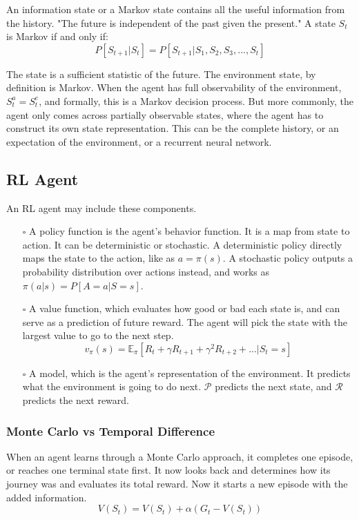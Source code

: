 \documentclass{article}
\begin{document}
An information state or a Markov state contains all the useful information from the history. "The future is independent of the past given the present." A state $S_t$ is Markov if and only if:
$$P[S_{t+1}|S_t] = P[S_{t+1}|S_1, S_2, S_3, ..., S_t]$$

The state is a sufficient statistic of the future. The environment state, by definition is Markov. When the agent has full observability of the environment, $S_t^a=S_t^e$, and formally, this is a Markov decision process. But more commonly, the agent only comes across partially observable states, where the agent has to construct its own state representation. This can be the complete history, or an expectation of the environment, or a recurrent neural network. 

\subsection{RL Agent}
An RL agent may include these components.
\begin{itemize}
\item[$\square$] A policy function is the agent's behavior function. It is a map from state to action. It can be deterministic or stochastic. A deterministic policy directly maps the state to the action, like as $a = \pi(s)$. A stochastic policy outputs a probability distribution over actions instead, and works as $\pi(a|s) = P[A=a|S=s]$.
\item[$\square$] A value function, which evaluates how good or bad each state is, and can serve as a prediction of future reward. The agent will pick the state with the largest value to go to the next step.
$$v_{\pi}(s) = \mathbb{E}_{\pi}[R_t + \gamma R_{t+1} + \gamma^2 R_{t+2} + ... | S_t = s]$$
\item[$\square$] A model, which is the agent's representation of the environment. It predicts what the environment is going to do next. $\mathcal{P}$ predicts the next state, and $\mathcal{R}$ predicts the next reward.
\end{itemize}

\subsubsection{Monte Carlo vs Temporal Difference}

When an agent learns through a Monte Carlo approach, it completes one episode, or reaches one terminal state first. It now looks back and determines how its journey was and evaluates its total reward. Now it starts a new episode with the added information.
$$V(S_t) = V(S_t) + \alpha\left(G_t - V(S_t)\right)$$
\end{document}
